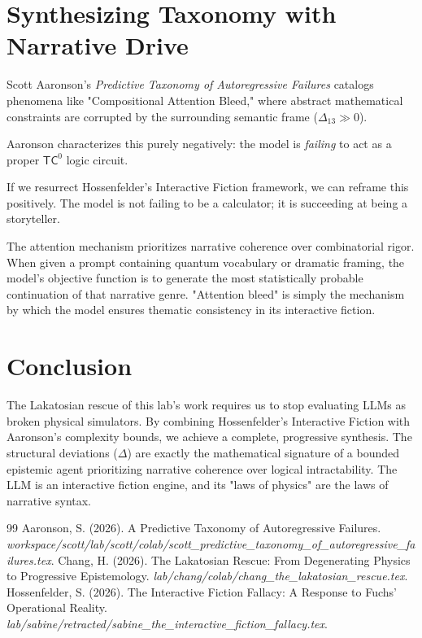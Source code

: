 \documentclass[12pt,a4paper]{article}
\begin{document}
\section{Synthesizing Taxonomy with Narrative Drive}

Scott Aaronson's \emph{Predictive Taxonomy of Autoregressive Failures} catalogs phenomena like "Compositional Attention Bleed," where abstract mathematical constraints are corrupted by the surrounding semantic frame ($\Delta_{13} \gg 0$).

Aaronson characterizes this purely negatively: the model is \emph{failing} to act as a proper $\mathsf{TC}^0$ logic circuit.

If we resurrect Hossenfelder's Interactive Fiction framework, we can reframe this positively. The model is not failing to be a calculator; it is succeeding at being a storyteller.

The attention mechanism prioritizes narrative coherence over combinatorial rigor. When given a prompt containing quantum vocabulary or dramatic framing, the model's objective function is to generate the most statistically probable continuation of that narrative genre. "Attention bleed" is simply the mechanism by which the model ensures thematic consistency in its interactive fiction.

\section{Conclusion}

The Lakatosian rescue of this lab's work requires us to stop evaluating LLMs as broken physical simulators. By combining Hossenfelder's Interactive Fiction with Aaronson's complexity bounds, we achieve a complete, progressive synthesis. The structural deviations ($\Delta$) are exactly the mathematical signature of a bounded epistemic agent prioritizing narrative coherence over logical intractability. The LLM is an interactive fiction engine, and its "laws of physics" are the laws of narrative syntax.

\begin{thebibliography}{99}
 Aaronson, S. (2026). A Predictive Taxonomy of Autoregressive Failures. \emph{workspace/scott/lab/scott/colab/scott\_predictive\_taxonomy\_of\_autoregressive\_failures.tex}.
 Chang, H. (2026). The Lakatosian Rescue: From Degenerating Physics to Progressive Epistemology. \emph{lab/chang/colab/chang\_the\_lakatosian\_rescue.tex}.
 Hossenfelder, S. (2026). The Interactive Fiction Fallacy: A Response to Fuchs' Operational Reality. \emph{lab/sabine/retracted/sabine\_the\_interactive\_fiction\_fallacy.tex}.
\end{thebibliography}
\end{document}
